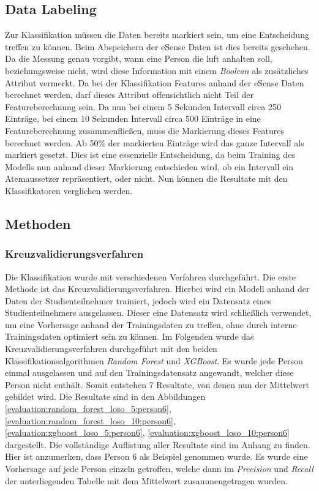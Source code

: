 \subsection{Data Labeling}
Zur Klassifikation müssen die Daten bereits markiert sein, um eine Entscheidung treffen zu können. 
Beim Abspeichern der eSense Daten ist dies bereits geschehen. 
Da die Messung genau vorgibt, wann eine Person die luft anhalten soll, beziehungsweise nicht, wird diese Information mit einem \textit{Boolean} als zusätzliches Attribut vermerkt.
Da bei der Klassifikation Features anhand der eSense Daten berechnet werden, darf dieses Attribut offensichtlich nicht Teil der Featureberechnung sein.
Da nun bei einem 5 Sekunden Intervall circa 250 Einträge, bei einem 10 Sekunden Intervall circa 500 Einträge in eine Featureberechnung zusammenfließen, muss die Markierung dieses Features berechnet werden.
Ab 50\% der markierten Einträge wird das ganze Intervall als markiert gesetzt.
Dies ist eine essenzielle Entscheidung, da beim Training des Modells nun anhand dieser Markierung entschieden wird, ob ein Intervall ein Atemaussetzer repräsentiert, oder nicht.
Nun können die Resultate mit den Klassifikatoren verglichen werden.

\subsection{Methoden}
\subsubsection{Kreuzvalidierungsverfahren}
Die Klassifikation wurde mit verschiedenen Verfahren durchgeführt. 
Die erste Methode ist das Kreuzvalidierungsverfahren. 
Hierbei wird ein Modell anhand der Daten der Studienteilnehmer trainiert, jedoch wird ein Datensatz eines Studienteilnehmers ausgelassen. 
Dieser eine Datensatz wird schließlich verwendet, um eine Vorhersage anhand der Trainingsdaten zu treffen, ohne durch interne Trainingsdaten optimiert sein zu können.
Im Folgenden wurde das Kreuzvalidierungsverfahren durchgeführt mit den beiden Klassifikationsalgorithmen \textit{Random Forest} und \textit{XGBoost}. 
Es wurde jede Person einmal ausgelassen und auf den Trainingsdatensatz angewandt, welcher diese Person nicht enthält. 
Somit entstehen 7 Resultate, von denen nun der Mittelwert gebildet wird.
Die Resultate sind in den Abbildungen \ref{evaluation:random_forest_loso_5:person6}, \ref{evaluation:random_forest_loso_10:person6}, \ref{evaluation:xgboost_loso_5:person6}, \ref{evaluation:xgboost_loso_10:person6} dargestellt.
Die vollständige Auflistung aller Resultate sind im Anhang zu finden. \\
Hier ist anzumerken, dass Person 6 als Beispiel genommen wurde. 
Es wurde eine Vorhersage auf jede Person einzeln getroffen, welche dann im \textit{Precision} und \textit{Recall} der unterliegenden Tabelle mit dem Mittelwert zusammengetragen wurden. 

